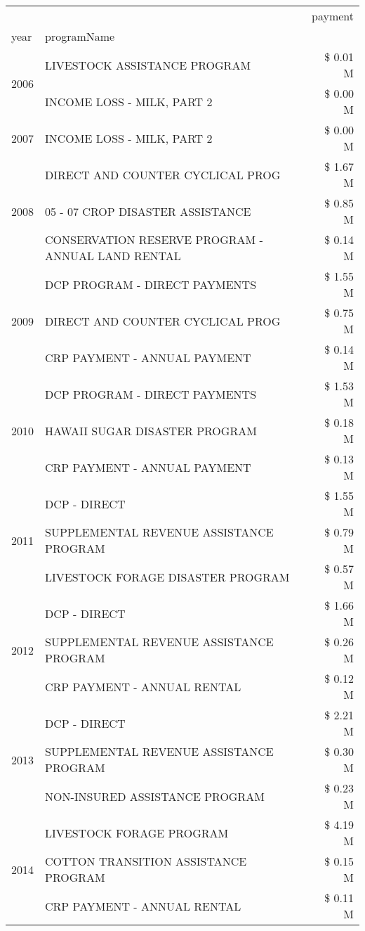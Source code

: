 \begin{tabular}{llr}
\toprule
 &  & payment \\
year & programName &  \\
\midrule
\multirow[t]{2}{*}{2006} & LIVESTOCK ASSISTANCE PROGRAM & \$ 0.01 M \\
 & INCOME LOSS - MILK, PART 2 & \$ 0.00 M \\
\cline{1-3}
2007 & INCOME LOSS - MILK, PART 2 & \$ 0.00 M \\
\cline{1-3}
\multirow[t]{3}{*}{2008} & DIRECT AND COUNTER CYCLICAL PROG & \$ 1.67 M \\
 & 05 - 07 CROP DISASTER ASSISTANCE & \$ 0.85 M \\
 & CONSERVATION RESERVE PROGRAM - ANNUAL LAND RENTAL & \$ 0.14 M \\
\cline{1-3}
\multirow[t]{3}{*}{2009} & DCP PROGRAM - DIRECT PAYMENTS & \$ 1.55 M \\
 & DIRECT AND COUNTER CYCLICAL PROG & \$ 0.75 M \\
 & CRP PAYMENT - ANNUAL PAYMENT & \$ 0.14 M \\
\cline{1-3}
\multirow[t]{3}{*}{2010} & DCP PROGRAM - DIRECT PAYMENTS & \$ 1.53 M \\
 & HAWAII SUGAR DISASTER PROGRAM & \$ 0.18 M \\
 & CRP PAYMENT - ANNUAL PAYMENT & \$ 0.13 M \\
\cline{1-3}
\multirow[t]{3}{*}{2011} & DCP - DIRECT & \$ 1.55 M \\
 & SUPPLEMENTAL REVENUE ASSISTANCE PROGRAM & \$ 0.79 M \\
 & LIVESTOCK FORAGE DISASTER PROGRAM & \$ 0.57 M \\
\cline{1-3}
\multirow[t]{3}{*}{2012} & DCP - DIRECT & \$ 1.66 M \\
 & SUPPLEMENTAL REVENUE ASSISTANCE PROGRAM & \$ 0.26 M \\
 & CRP PAYMENT - ANNUAL RENTAL & \$ 0.12 M \\
\cline{1-3}
\multirow[t]{3}{*}{2013} & DCP - DIRECT & \$ 2.21 M \\
 & SUPPLEMENTAL REVENUE ASSISTANCE PROGRAM & \$ 0.30 M \\
 & NON-INSURED ASSISTANCE PROGRAM & \$ 0.23 M \\
\cline{1-3}
\multirow[t]{3}{*}{2014} & LIVESTOCK FORAGE PROGRAM & \$ 4.19 M \\
 & COTTON TRANSITION ASSISTANCE PROGRAM & \$ 0.15 M \\
 & CRP PAYMENT - ANNUAL RENTAL & \$ 0.11 M \\

\end{tabular}
